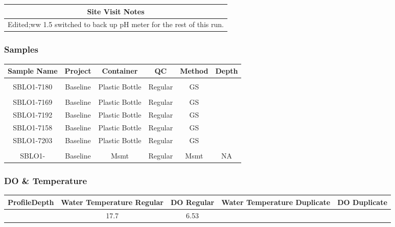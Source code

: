 \documentclass[
  letterpaper,
  DIV=11,
  numbers=noendperiod]{scrartcl}
\begin{document}
\begin{longtable*}{c}
\toprule
Site Visit Notes \\ 
\midrule\addlinespace[2.5pt]
Edited;ww 1.5
switched to back up pH meter for the rest of this run. \\ 
\bottomrule
\end{longtable*}

\subsubsection{Samples}

\begin{longtable*}{cccccc}
\toprule
Sample Name & Project & Container & QC & Method & Depth \\ 
\midrule\addlinespace[2.5pt]
 \\ 
\midrule\addlinespace[2.5pt]
SBLO1-7180 & Baseline & Plastic Bottle & Regular & GS &  \\ 
\midrule\addlinespace[2.5pt]
 \\ 
\midrule\addlinespace[2.5pt]
SBLO1-7169 & Baseline & Plastic Bottle & Regular & GS &  \\ 
SBLO1-7192 & Baseline & Plastic Bottle & Regular & GS &  \\ 
SBLO1-7158 & Baseline & Plastic Bottle & Regular & GS &  \\ 
SBLO1-7203 & Baseline & Plastic Bottle & Regular & GS &  \\ 
\midrule\addlinespace[2.5pt]
 \\ 
\midrule\addlinespace[2.5pt]
SBLO1- & Baseline & Msmt & Regular & Msmt & NA \\ 
\bottomrule
\end{longtable*}

\subsubsection{DO \& Temperature}

\begin{longtable*}{rcccc}
\toprule
ProfileDepth & Water Temperature Regular & DO Regular & Water Temperature Duplicate & DO Duplicate \\ 
\midrule{} & 17.7 & 6.53 &  &  \\ 
\bottomrule
\end{longtable*}
\end{document}
